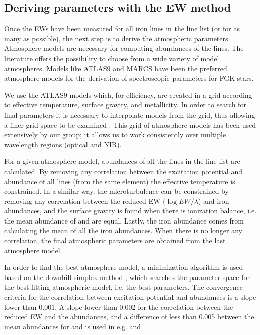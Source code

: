 \documentclass{aa}
\begin{document}
\subsection{Deriving parameters with the EW method}
\label{sec:deriving_parameters_with_the_ew_method}

Once the EWs have been measured for all iron lines in the line list
(or for as many as possible), the next step is to derive the atmospheric
parameters. Atmosphere models are necessary for computing abundances of
the lines. The literature offers the possibility to choose from a wide
variety of model atmospheres. Models like ATLAS9 \citep{Kurucz1993} and
MARCS \citep{Gustafson2008} have been the preferred atmosphere models
for the derivation of spectroscopic parameters for FGK stars.

We use the ATLAS9 models which, for efficiency, are created in a grid
according to effective temperature, surface gravity, and metallicity.
In order to search for final parameters it is necessary to interpolate
models from the grid, thus allowing  a finer grid space
to be examined \citep[see e.g.][]{Sousa2014}. This grid of atmosphere models has been
used extensively by our group; it  allows us to work consistently over
multiple wavelength regions (optical and NIR).

For a given atmosphere model, abundances of all the lines in the line
list are calculated. By removing any correlation between the excitation
potential and abundance of all lines (from the same element) the effective
temperature is constrained. In a similar way, the microturbulence
can be constrained by removing any correlation between the reduced EW
($\log EW/\lambda$) and iron abundances, and the surface gravity is
found when there is ionization balance, i.e. the mean abundance of
 and  are equal. Lastly, the iron abundance comes
from calculating the mean of all the iron abundances.
When there is no longer any correlation, the final atmospheric
parameters are obtained from the last atmosphere model.

In order to find the best atmosphere model, a minimization algorithm
is used based on the downhill simplex method \citep{Press1992}, which
searches  the parameter space for the best fitting atmospheric model,
i.e. the best parameters. The convergence criteria for the correlation
between excitation potential and abundances is a slope lower than
0.001. A slope lower than 0.002 for the correlation between the reduced
EW and the abundances, and a difference of less than 0.005 between
the mean abundances for  and  is used in e.g.
\cite{Sousa2008a} and \cite{Tsantaki2013}.
\end{document}
